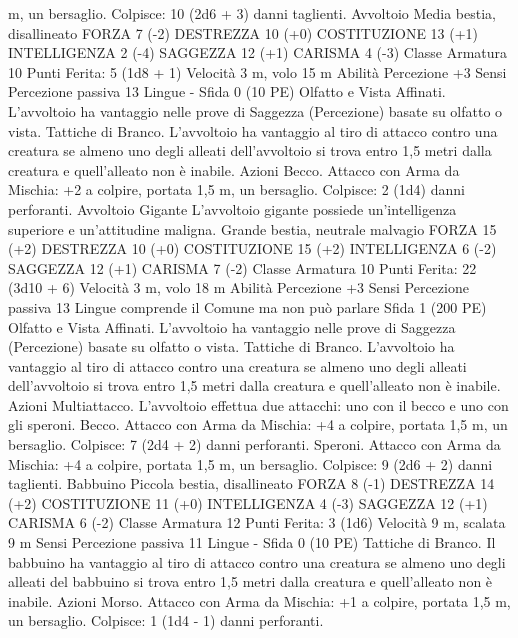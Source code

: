 \begin{multicols}{2}
m, un bersaglio.
Colpisce: 10 (2d6 + 3) danni taglienti.
Avvoltoio
Media bestia, disallineato
FORZA 7 (-2)
DESTREZZA 10 (+0)
COSTITUZIONE 13 (+1)
INTELLIGENZA 2 (-4)
SAGGEZZA 12 (+1)
CARISMA 4 (-3)
Classe Armatura 10
\hspace*{0pt}\hfill{Punti Ferita}: 5 (1d8 + 1)
Velocità 3 m, volo 15 m
Abilità Percezione +3
Sensi Percezione passiva 13
Lingue -
Sfida 0 (10 PE)
Olfatto e Vista Affinati. L’avvoltoio ha vantaggio nelle prove di
Saggezza (Percezione) basate su olfatto o vista.
Tattiche di Branco. L’avvoltoio ha vantaggio al tiro di attacco
contro una creatura se almeno uno degli alleati dell’avvoltoio si
trova entro 1,5 metri dalla creatura e quell’alleato non è inabile.
Azioni
Becco. Attacco con Arma da Mischia: +2 a colpire, portata 1,5
m, un bersaglio.
Colpisce: 2 (1d4) danni perforanti.
Avvoltoio Gigante
L’avvoltoio gigante possiede un’intelligenza superiore e
un’attitudine maligna.
Grande bestia, neutrale malvagio
FORZA 15 (+2)
DESTREZZA 10 (+0)
COSTITUZIONE 15 (+2)
INTELLIGENZA 6 (-2)
SAGGEZZA 12 (+1)
CARISMA 7 (-2)
Classe Armatura 10
\hspace*{0pt}\hfill{Punti Ferita}: 22 (3d10 + 6)
Velocità 3 m, volo 18 m
Abilità Percezione +3
Sensi Percezione passiva 13
Lingue comprende il Comune ma non può parlare
Sfida 1 (200 PE)
Olfatto e Vista Affinati. L’avvoltoio ha vantaggio nelle prove di
Saggezza (Percezione) basate su olfatto o vista.
Tattiche di Branco. L’avvoltoio ha vantaggio al tiro di attacco
contro una creatura se almeno uno degli alleati dell’avvoltoio si
trova entro 1,5 metri dalla creatura e quell’alleato non è inabile.
Azioni
Multiattacco. L’avvoltoio effettua due attacchi: uno con il becco
e uno con gli speroni.
Becco. Attacco con Arma da Mischia: +4 a colpire, portata 1,5
m, un bersaglio.
Colpisce: 7 (2d4 + 2) danni perforanti.
Speroni. Attacco con Arma da Mischia: +4 a colpire, portata 1,5
m, un bersaglio.
Colpisce: 9 (2d6 + 2) danni taglienti.
Babbuino
Piccola bestia, disallineato
FORZA 8 (-1)
DESTREZZA 14 (+2)
COSTITUZIONE 11 (+0)
INTELLIGENZA 4 (-3)
SAGGEZZA 12 (+1)
CARISMA 6 (-2)
Classe Armatura 12
\hspace*{0pt}\hfill{Punti Ferita}: 3 (1d6)
Velocità 9 m, scalata 9 m
Sensi Percezione passiva 11
Lingue -
Sfida 0 (10 PE)
Tattiche di Branco. Il babbuino ha vantaggio al tiro di attacco
contro una creatura se almeno uno degli alleati del babbuino si
trova entro 1,5 metri dalla creatura e quell’alleato non è inabile.
Azioni
Morso. Attacco con Arma da Mischia: +1 a colpire, portata 1,5
m, un bersaglio.
Colpisce: 1 (1d4 - 1) danni perforanti.

\end{multicols}

